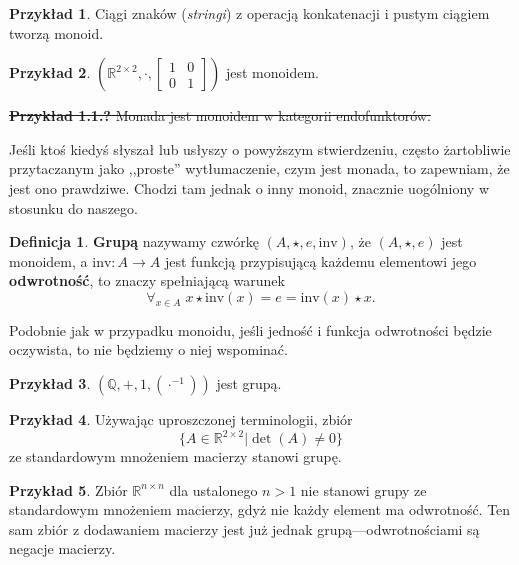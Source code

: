 \documentclass{article}
\theoremstyle{definition}
\newtheorem{definition}{Definicja}[section]
\newtheorem{example}{Przykład}[section]
\begin{document}
\begin{example}
	Ciągi znaków (\textit{stringi}) z operacją konkatenacji i pustym ciągiem tworzą monoid.
\end{example}

\begin{example}
	$\left(\mathbb{R}^{2 \times 2}, \cdot, \left[\begin{matrix} 1 & 0 \\ 0 & 1 \end{matrix}\right]\right)$ jest monoidem.
\end{example}

\noindent\sout{
	\textbf{Przykład 1.1.?} Monada jest monoidem w kategorii endofunktorów.
}

Jeśli ktoś kiedyś słyszał lub usłyszy o powyższym stwierdzeniu,
	często żartobliwie przytaczanym jako ,,proste'' wytłumaczenie,
	czym jest monada, to zapewniam, że jest ono prawdziwe.
Chodzi tam jednak o inny monoid,
	znacznie uogólniony w stosunku do naszego.

\begin{definition}
    \textbf{Grupą} nazywamy czwórkę $(A, \star, e, \mathrm{inv})$,
		że $(A, \star, e)$ jest monoidem,
		a $\mathrm{inv}: A \to A$ jest funkcją przypisującą każdemu elementowi jego \textbf{odwrotność},
		to znaczy spełniającą warunek
	\begin{equation*}
		\forall_{x \in A}\; {x\star \mathrm{inv}(x) = e = \mathrm{inv}(x) \star x}.
	\end{equation*}
\end{definition}
Podobnie jak w przypadku monoidu,
	jeśli jedność i funkcja odwrotności będzie oczywista,
	to nie będziemy o niej wspominać.

\begin{example}
	$(\mathbb{Q}, +, 1, (\cdot^{-1}))$ jest grupą.
\end{example}

\begin{example}
	Używając uproszczonej terminologii, zbiór
	\begin{equation}
		\{A \in \mathbb{R}^{2 \times 2} | \det(A) \neq 0 \}
	\end{equation}
		ze standardowym mnożeniem macierzy stanowi grupę.
\end{example}

\begin{example}
	Zbiór $\mathbb{R}^{n \times n}$ dla ustalonego $n > 1$ nie stanowi grupy
		ze standardowym mnożeniem macierzy,
		gdyż nie każdy element ma odwrotność.
	Ten sam zbiór z dodawaniem macierzy jest już jednak grupą---odwrotnościami są negacje macierzy.
\end{example}
\end{document}
